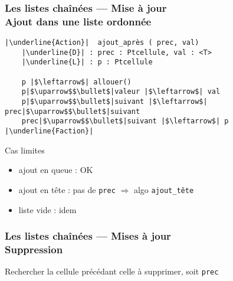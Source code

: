 \documentclass[table,handout,tikz,12pt,svgnames]{beamer}
\begin{document}
\begin{frame}[fragile=singleslide]
	\frametitle{Les listes chaînées --- Mise à jour \\\normalsize Ajout dans une liste ordonnée}
	\vspace{-0.7cm}
	\begin{block}{} %
		\begin{verbatim}
|\underline{Action}|  ajout_après ( prec, val)
	|\underline{D}| : prec : Ptcellule, val : <T>
	|\underline{L}| : p : Ptcellule

	p |$\leftarrow$| allouer()
	p|$\uparrow$$\bullet$|valeur |$\leftarrow$| val
	p|$\uparrow$$\bullet$|suivant |$\leftarrow$| prec|$\uparrow$$\bullet$|suivant
	prec|$\uparrow$$\bullet$|suivant |$\leftarrow$| p
|\underline{Faction}|
		\end{verbatim}
	\end{block}
	\begin{block}{Cas limites}\end{block}
		\vspace{-0.6cm}
		\begin{itemize}
			\item ajout en queue : OK
			\item ajout en tête : pas de \texttt{prec} $\Rightarrow$ algo \texttt{ajout\_tête}
			\item liste vide : idem
		\end{itemize}
\end{frame}

\begin{frame}[fragile=singleslide]
	\frametitle{Les listes chaînées --- Mises à jour \\\normalsize Suppression}
		\vspace{6cm}
	\begin{block}{Rechercher la cellule précédant celle à supprimer, soit \texttt{prec}}
	\end{block}
\end{frame}
\end{document}
